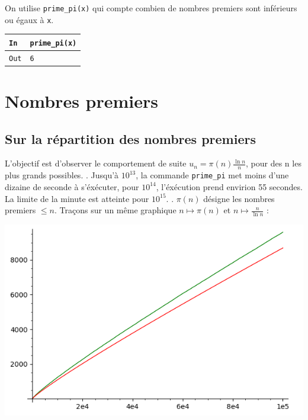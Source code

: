 \documentclass[titlepage]{article}
\begin{document}
    On utilise \texttt{prime\_pi(x)} qui compte combien de nombres premiers sont inférieurs ou égaux à \texttt{x}. \bigbreak

    \begin{tabularx}{12cm}{|p{0.60cm}|X|}
        \hline
        \rowcolor{gray}
        \texttt{In}
        & 
        \texttt{prime\_pi(x)}
        \\
        \hline
        \texttt{Out}
        &
        \texttt{6}
        \\
        \hline
    \end{tabularx}
    \bigbreak

    \section{Nombres premiers}
    \subsection{Sur la répartition des nombres premiers}
    \bigbreak
    L’objectif est d’observer le comportement de suite $u_n = \pi(n)\frac{\ln n}{n}$, pour des n les plus grands possibles.
    . Jusqu'à $10^{13}$, la commande \texttt{prime\_pi} met moins d'une dizaine de seconde à s'éxécuter, pour $10^{14}$, l'éxécution prend envirion 55 secondes. La limite de la minute est atteinte pour $10^{15}$.
    . $\pi (n)$ désigne les nombres premiers $\leq n$.\newline
    Traçons sur un même graphique $n \mapsto \pi (n)$ et $n \mapsto \frac{n}{\ln n}$ :  
    \begin{center}
        \includegraphics[scale=0.5]{Ressources/2022-04-27-10:20:27-screenshot.png}
        \end{center}
\end{document}
